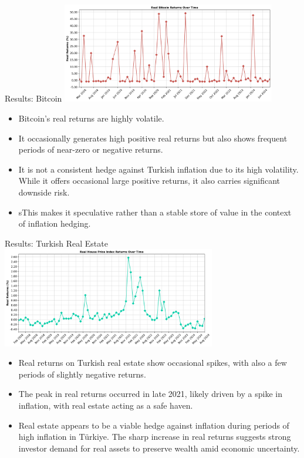\documentclass{beamer}
\begin{document}
\begin{frame}{Results: Bitcoin}
\includegraphics[width=0.7\textwidth]{real_bitcoin_returns.png}
\begin{itemize}
\item Bitcoin's real returns are highly volatile.
\item It occasionally generates high positive real returns but also shows frequent periods of near-zero or negative returns.
\item It is not a consistent hedge against Turkish inflation due to its high volatility. While it offers occasional large positive returns, it also carries significant downside risk.
\item sThis makes it speculative rather than a stable store of value in the context of inflation hedging.
\end{itemize}
\end{frame}

\begin{frame}{Results: Turkish Real Estate}
\includegraphics[width=0.7\textwidth]{real_hpi_returns.png}
\begin{itemize}
\item Real returns on Turkish real estate show occasional spikes, with also a few periods of slightly negative returns.
\item The peak in real returns occurred in late 2021, likely driven by a spike in inflation, with real estate acting as a safe haven.
\item Real estate appears to be a viable hedge against inflation during periods of high inflation in Türkiye. The sharp increase in real returns suggests strong investor demand for real assets to preserve wealth amid economic uncertainty.
\end{itemize}
\end{frame}
\end{document}

